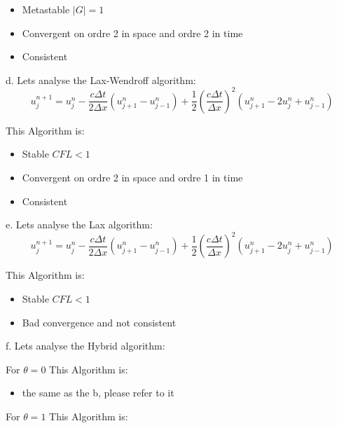 \documentclass[12pt]{article}
\begin{document}
\begin{itemize}
    \item Metastable $|G| = 1$
    \item Convergent on ordre 2 in space and ordre 2 in time 
    \item Consistent\\[1cm]
\end{itemize}

d. Lets analyse the Lax-Wendroff algorithm:
\begin{equation}
    u_j^{n+1} = u_j^n - \frac{c \Delta t}{2 \Delta x} \left( u_{j+1}^n - u_{j-1}^n \right)
+ \frac{1}{2} \left( \frac{c \Delta t}{\Delta x} \right)^2 \left( u_{j+1}^n - 2 u_j^n + u_{j-1}^n \right)
\end{equation}

This Algorithm is:

\begin{itemize}
    \item Stable $CFL<1$
    \item Convergent on ordre 2 in space and ordre 1 in time 
    \item Consistent\\[1cm]
\end{itemize}

e. Lets analyse the Lax algorithm:
\begin{equation}
    u_j^{n+1} = u_j^n - \frac{c \Delta t}{2 \Delta x} \left( u_{j+1}^n - u_{j-1}^n \right)
+ \frac{1}{2} \left( \frac{c \Delta t}{\Delta x} \right)^2 \left( u_{j+1}^n - 2 u_j^n + u_{j-1}^n \right)
\end{equation}

This Algorithm is:

\begin{itemize}
    \item Stable $CFL<1$
    \item Bad convergence and not consistent\\[1cm]
\end{itemize}

f. Lets analyse the Hybrid algorithm:

For $\theta = 0$ This Algorithm is:

\begin{itemize}
    \item the same as the b, please refer to it \\[1cm]
\end{itemize}

For $\theta = 1$ This Algorithm is:
\end{document}
